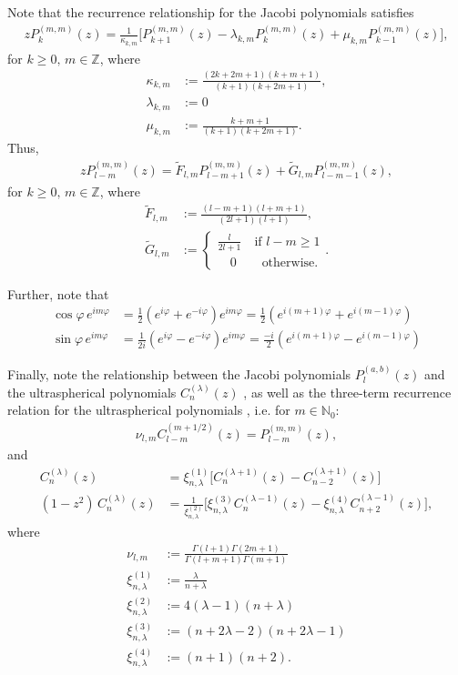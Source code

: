 \documentclass[11pt, oneside]{article}   	%
\newcommand{\Z}{\mathbb{Z}}
\newcommand{\No}{\mathbb{N}_0}
\newcommand{\cosphi}{\cos\varphi}
\newcommand{\sinphi}{\sin\varphi}
\newcommand{\eimphi}{e^{im\varphi}}
\newcommand{\Ftilde}{\tilde{F}_{l,m}}
\newcommand{\Gtilde}{\tilde{G}_{l,m}}
\newcommand{\xione}{\xi^{(1)}_{n, \lambda}}
\newcommand{\xitwo}{\xi^{(2)}_{n, \lambda}}
\newcommand{\xithree}{\xi^{(3)}_{n, \lambda}}
\newcommand{\xifour}{\xi^{(4)}_{n, \lambda}}
\begin{document}
Note that the recurrence relationship for the Jacobi polynomials satisfies \cite{DLMFJacobiRecurrence}
\begin{align}
z P^{(m,m)}_k(z) = \frac{1}{\kappa_{k,m}} \big[ P^{(m,m)}_{k+1}(z) - \lambda_{k,m} P^{(m,m)}_k(z) + \mu_{k,m} P^{(m,m)}_{k-1}(z) \big],
\end{align}
for \(k\ge0, \, m\in\Z\), where
\begin{align}
\kappa_{k,m} &:= \frac{(2k+2m+1)(k+m+1)}{(k+1)(k+2m+1)}, \\
\lambda_{k,m} &:= 0\\
\mu_{k,m} &:= \frac{k+m+1}{(k+1)(k+2m+1)}.
\end{align}
Thus,
\begin{align}
z P^{(m,m)}_{l-m}(z) = \Ftilde P^{(m,m)}_{l-m+1}(z) + \Gtilde P^{(m,m)}_{l-m-1}(z),
\end{align}
for \(k\ge0, \, m\in\Z\), where
\begin{align}
\Ftilde &:= \frac{(l-m+1)(l+m+1)}{(2l+1)(l+1)}, \\
\Gtilde &:= \begin{cases}
			\frac{l}{2l+1} \quad \text{if } l - m \ge 1 \\
			\quad 0 \quad \quad \text{otherwise.}
		\end{cases} .
\end{align}

Further, note that
\begin{align}
\cosphi \, \eimphi &= \frac{1}{2} (e^{i\varphi} + e^{-i\varphi}) \eimphi =  \frac{1}{2} (e^{i(m+1)\varphi} + e^{i(m-1)\varphi}) \\
\sinphi \, \eimphi &= \frac{1}{2i} (e^{i\varphi} - e^{-i\varphi}) \eimphi =  \frac{-i}{2} (e^{i(m+1)\varphi} - e^{i(m-1)\varphi})
\end{align}

Finally, note the relationship between the Jacobi polynomials \(P^{(a,b)}_{l}(z)\) and the ultraspherical polynomials \(C^{(\lambda)}_{n}(z)\) \cite{DLMFUltraJacobi}, as well as the three-term recurrence relation for the ultraspherical polynomials \cite{DLMFUltraRecurrence, DLMFUltraRecurrence2}, i.e. for \(m \in \No\):
\begin{align}
\nu_{l,m} C^{(m+1/2)}_{l-m}(z) = P^{(m,m)}_{l-m}(z),
\end{align}
and
\begin{align}
C^{(\lambda)}_n(z) &= \xi^{(1)}_{n, \lambda} \big[ C^{(\lambda+1)}_n(z) - C^{(\lambda+1)}_{n-2}(z) \big]  \\
(1-z^2) \, C^{(\lambda)}_n(z) &= \frac{1}{\xi^{(2)}_{n, \lambda}} \big[ \xi^{(3)}_{n, \lambda} C^{(\lambda-1)}_n(z) - \xi^{(4)}_{n, \lambda}C^{(\lambda-1)}_{n+2}(z) \big] ,
\end{align}
where
\begin{align}
\nu_{l,m} &:= \frac{\Gamma(l+1)\Gamma(2m+1)}{\Gamma(l+m+1)\Gamma(m+1)} \\
\xione&:= \frac{\lambda}{n+\lambda} \\
\xitwo &:= 4(\lambda-1)(n+\lambda) \\
\xithree &:= (n+2\lambda-2)(n+2\lambda-1) \\
\xifour &:= (n+1)(n+2).
\end{align}
\end{document}
